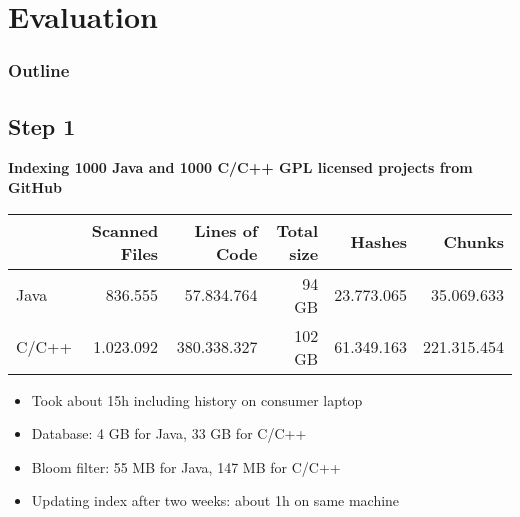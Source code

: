 
\section{Evaluation}
\begin{frame}
	\frametitle{Outline} 
	\tableofcontents[
		currentsection,
		subsectionstyle=hide
	]
	
\end{frame}

\subsection{Step 1}
\begin{frame}{\insertsubsection}
	\textbf{Indexing 1000 Java and 1000 C/C++ GPL licensed projects from GitHub}
	
	\begin{table}[ht]
		\centering
		\scriptsize
		\begin{tabular}{l|rrrrr}
			& \textbf{Scanned Files} & \textbf{Lines of Code} & \textbf{Total size} & \textbf{Hashes} & \textbf{Chunks} \\ 
			\hline 
			Java & 836.555 & 57.834.764 & 94 GB & 23.773.065 & 35.069.633 \\
			C/C++ & 1.023.092 & 380.338.327 & 102 GB & 61.349.163 & 221.315.454 \\ 
		\end{tabular}
	\end{table}

	\begin{itemize}
		\small
		\item Took about 15h including history on consumer laptop
		\item Database: 4 GB for Java, 33 GB for C/C++
		\item Bloom filter: 55 MB for Java, 147 MB for C/C++
		\item Updating index after two weeks: about 1h on same machine
	\end{itemize}

\end{frame}

